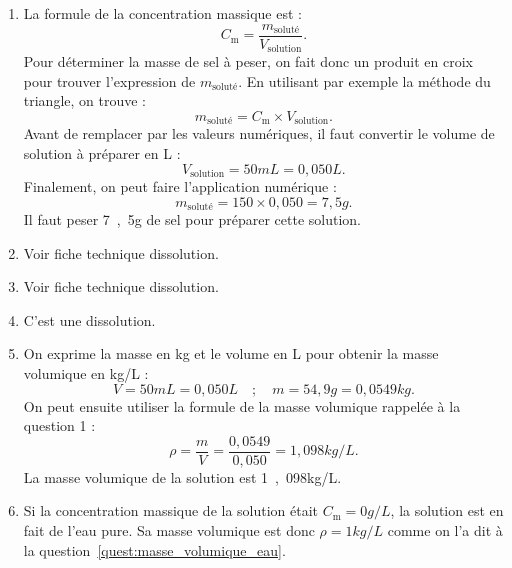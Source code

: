 \begin{enumerate}[resume]
\item La formule de la concentration massique est :
\begin{equation}
C_\mathrm{m} = \frac{m_\mathrm{soluté}}{V_\mathrm{solution}}.
\nonumber
\end{equation}
Pour déterminer la masse de sel à peser, on fait donc un \og produit en croix \fg{} pour trouver l'expression de $m_\mathrm{soluté}$.
En utilisant par exemple la méthode du triangle, on trouve :
\begin{equation}
m_\mathrm{soluté} = C_\mathrm{m} \times V_\mathrm{solution}.
\nonumber
\end{equation}
Avant de remplacer par les valeurs numériques, il faut convertir le volume de solution à préparer en L :
\begin{equation}
V_\mathrm{solution} = \unit{50}{mL} = \unit{0{,}050}{L}.
\nonumber
\end{equation}
Finalement, on peut faire l'application numérique :
\begin{equation}
m_\mathrm{soluté} = 150 \times 0{,}050 = \unit{7{,}5}{g}.
\nonumber
\end{equation}
Il faut peser \unit{7{,}5}{g} de sel pour préparer cette solution.

\item Voir fiche technique dissolution.

\item Voir fiche technique dissolution.

\item C'est une dissolution.

\item On exprime la masse en kg et le volume en L pour obtenir la masse volumique en kg/L :
\begin{equation}
V = \unit{50}{mL} = \unit{0{,}050}{L} \quad ; \quad m = \unit{54{,}9}{g} = \unit{0{,}0549}{kg}.
\nonumber
\end{equation}
On peut ensuite utiliser la formule de la masse volumique rappelée à la question 1 :
\begin{equation}
\rho = \frac{m}{V} = \frac{0{,}0549}{0{,}050} = \unit{1{,}098}{kg/L}.
\nonumber
\end{equation}
La masse volumique de la solution est \unit{1{,}098}{kg/L}.

\item Si la concentration massique de la solution était $C_\mathrm{m} = \unit{0}{g/L}$, la solution est en fait de l'eau pure.
Sa masse volumique est donc $\rho = \unit{1}{kg/L}$ comme on l'a dit à la question~\ref{quest:masse_volumique_eau}.


\end{enumerate}
